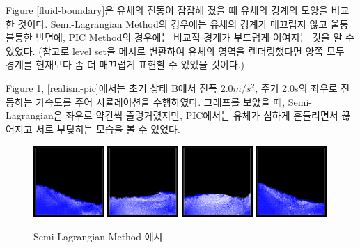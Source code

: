 \documentclass[12pt, A4]{article}
\begin{document}
Figure \ref{fluid-boundary}은 유체의 진동이 잠잠해 졌을 때 유체의 경계의 모양을 비교한 것이다. Semi-Lagrangian Method의 경우에는 유체의 경계가 매끄럽지 않고 울퉁불퉁한 반면에, PIC Method의 경우에는 비교적 경계가 부드럽게 이여지는 것을 알 수 있었다. (참고로 level set을 메시로 변환하여 유체의 영역을 렌더링했다면 양쪽 모두 경계를 현재보다 좀 더 매끄럽게 표현할 수 있었을 것이다.)

Figure \ref{realism-semilag}, \ref{realism-pic}에서는 초기 상태 B에서 진폭 2.0$m/s^2$, 주기 2.0s의 좌우로 진동하는 가속도를 주어 시뮬레이션을 수행하였다. 그래프를 보았을 때, Semi-Lagrangian은 좌우로 약간씩 출렁거렸지만, PIC에서는 유체가 심하게 흔들리면서 끊어지고 서로 부딪히는 모습을 볼 수 있었다.

\begin{figure}[h]
\includegraphics[width=0.24\textwidth]{realism-semilag-1}
\includegraphics[width=0.24\textwidth]{realism-semilag-2}
\includegraphics[width=0.24\textwidth]{realism-semilag-3}
\includegraphics[width=0.24\textwidth]{realism-semilag-4}
  \caption{Semi-Lagrangian Method 예시.}
  \label{realism-semilag}
\end{figure}
\end{document}
